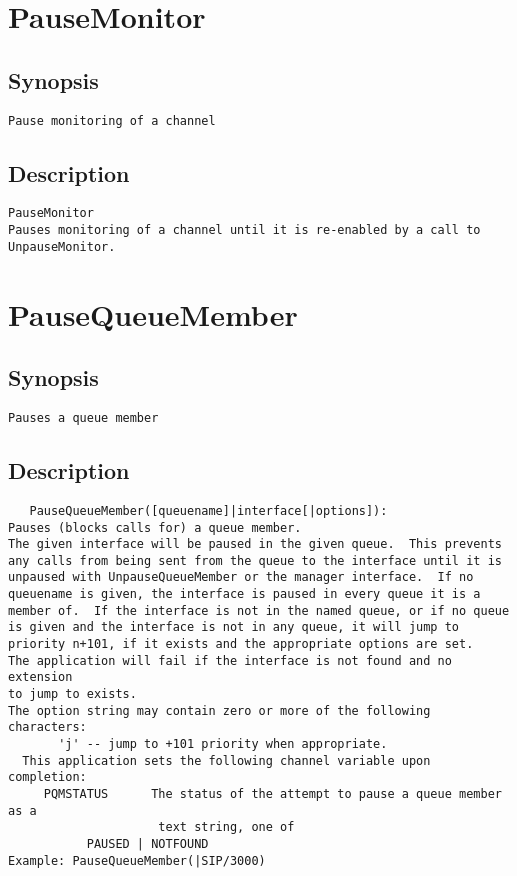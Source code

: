 \section{PauseMonitor}
\subsection{Synopsis}
\begin{verbatim}
Pause monitoring of a channel
\end{verbatim}
\subsection{Description}
\begin{verbatim}
PauseMonitor
Pauses monitoring of a channel until it is re-enabled by a call to UnpauseMonitor.

\end{verbatim}


\section{PauseQueueMember}
\subsection{Synopsis}
\begin{verbatim}
Pauses a queue member
\end{verbatim}
\subsection{Description}
\begin{verbatim}
   PauseQueueMember([queuename]|interface[|options]):
Pauses (blocks calls for) a queue member.
The given interface will be paused in the given queue.  This prevents
any calls from being sent from the queue to the interface until it is
unpaused with UnpauseQueueMember or the manager interface.  If no
queuename is given, the interface is paused in every queue it is a
member of.  If the interface is not in the named queue, or if no queue
is given and the interface is not in any queue, it will jump to
priority n+101, if it exists and the appropriate options are set.
The application will fail if the interface is not found and no extension
to jump to exists.
The option string may contain zero or more of the following characters:
       'j' -- jump to +101 priority when appropriate.
  This application sets the following channel variable upon completion:
     PQMSTATUS      The status of the attempt to pause a queue member as a
                     text string, one of
           PAUSED | NOTFOUND
Example: PauseQueueMember(|SIP/3000)

\end{verbatim}


